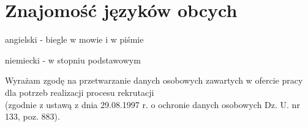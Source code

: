 \documentclass[letterpaper]{article}
\renewenvironment{itemize}{
  \begin{list}{}{
    \setlength{\leftmargin}{1.5em}
  }
}{
  \end{list}
}
\begin{document}
\section*{Znajomość języków obcych}

\begin{itemize}
\item angielski - biegle w mowie i w piśmie
\item niemiecki - w stopniu podstawowym
\end{itemize}


\bigskip

\begin{center}
  \begin{footnotesize}
    Wyrażam zgodę na przetwarzanie danych osobowych zawartych w ofercie pracy dla potrzeb realizacji procesu rekrutacji\\
    (zgodnie z ustawą z dnia 29.08.1997 r. o ochronie danych osobowych Dz. U. nr 133, poz. 883).
  \end{footnotesize}
\end{center}
\end{document}
